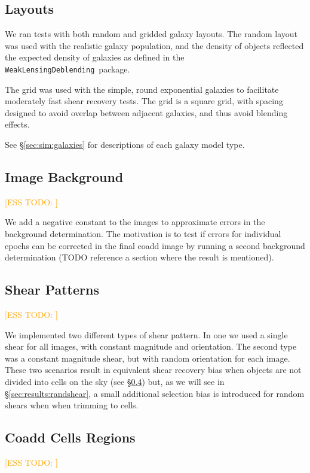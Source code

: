 \documentclass[iop, twocolappendix, appendixfloats, numberedappendix, apj]{hackemulateapj}
\newcommand{\esstodo}[1]{\textcolor{orange}{[ESS TODO: \bf #1]}}
\newcommand{\descwl}{\texttt{WeakLensingDeblending}}
\begin{document}
\subsection{Layouts} \label{sec:sim:layouts}

We ran tests with both random and gridded galaxy layouts.  The random layout
was used with the realistic galaxy population, and the density of objects
reflected the expected density of galaxies as defined in the \descwl\ package.

The grid was used with the simple, round exponential galaxies to facilitate
moderately fast shear recovery tests.  The grid is a square grid, with spacing
designed to avoid overlap between adjacent galaxies, and thus avoid blending
effects.

See \S \ref{sec:sim:galaxies} for descriptions of each galaxy model type.

\subsection{Image Background} \label{sec:sim:bgerr}
\esstodo{}

We add a negative constant to the images to approximate errors in the
background determination.  The motivation is to test if errors for individual
epochs can be corrected in the final coadd image by running a second background
determination (TODO reference a section where the result is mentioned).

\subsection{Shear Patterns} \label{sec:sim:shears}
\esstodo{}

We implemented two different types of shear pattern.  In one we used a single
shear for all images, with constant magnitude and orientation.  The second type
was a constant magnitude shear, but with random orientation for each image.
These two scenarios result in equivalent shear recovery bias when objects are
not divided into cells on the sky (see \S \ref{sec:sim:cells}) but, as we will
see in \S \ref{sec:results:randshear}, a small additional selection bias is
introduced for random shears when when trimming to cells.

\subsection{Coadd Cells Regions} \label{sec:sim:cells}
\esstodo{}
\end{document}

